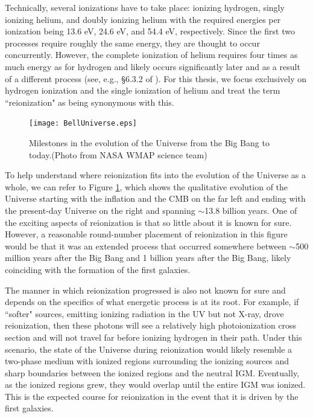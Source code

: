 Technically, several ionizations have to take place: ionizing hydrogen, singly ionizing helium, and doubly ionizing helium with the required energies per ionization being 13.6 eV, 24.6 eV, and 54.4 eV, respectively. Since the first two processes require roughly the same energy, they are thought to occur concurrently. However, the complete ionization of helium requires four times as much energy as for hydrogen and likely occurs significantly later and as a result of a different process (see, e.g., \S 6.3.2 of \citealt{barkana2001beginning}). For this thesis, we focus exclusively on hydrogen ionization and the single ionization of helium and treat the term ``reionization" as being synonymous with this. 


\begin{figure}[h]
  \centering
  \texttt{[image: BellUniverse.eps]}
  \caption{Milestones in the evolution of the Universe from the Big Bang to today.(Photo from NASA WMAP science team)}
  \label{fig:NASAWMAP}
\end{figure}


To help understand where reionization fits into the evolution of the Universe as a whole, we can refer to Figure \ref{fig:NASAWMAP}, which shows the qualitative evolution of the Universe starting with the inflation and the CMB on the far left and ending with the present-day Universe on the right and spanning $\sim$13.8 billion years. One of the exciting aspects of reionization is that so little about it is known for sure. However, a reasonable round-number placement of reionization in this figure would be that it was an extended process that occurred somewhere between $\sim$500 million years after the Big Bang and 1 billion years after the Big Bang, likely coinciding with the formation of the first galaxies. 


The manner in which reionization progressed is also not known for sure and depends on the specifics of what energetic process is at its root. For example, if ``softer" sources, emitting ionizing radiation in the UV but not X-ray, drove reionization, then these photons will see a relatively high photoionization cross section and will not travel far before ionizing hydrogen in their path. Under this scenario, the state of the Universe during reionization would likely resemble a two-phase medium with ionized regions surrounding the ionizing sources and sharp boundaries between the ionized regions and the neutral IGM. Eventually, as the ionized regions grew, they would overlap until the entire IGM was ionized. This is the expected course for reionization in the event that it is driven by the first galaxies.	


